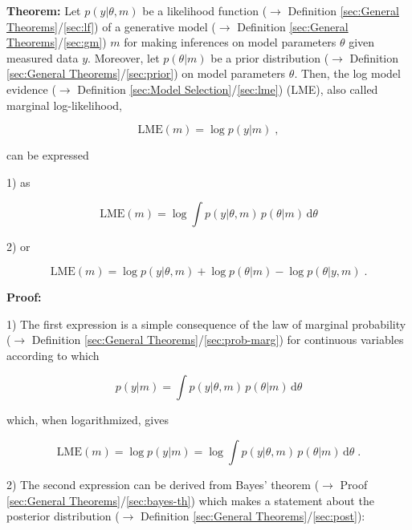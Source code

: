 \documentclass[a4paper,12pt,twoside]{book}
\begin{document}
\textbf{Theorem:} Let $p(y \vert \theta,m)$ be a likelihood function ($\rightarrow$ Definition \ref{sec:General Theorems}/\ref{sec:lf}) of a generative model ($\rightarrow$ Definition \ref{sec:General Theorems}/\ref{sec:gm}) $m$ for making inferences on model parameters $\theta$ given measured data $y$. Moreover, let $p(\theta \vert m)$ be a prior distribution ($\rightarrow$ Definition \ref{sec:General Theorems}/\ref{sec:prior}) on model parameters $\theta$. Then, the log model evidence ($\rightarrow$ Definition \ref{sec:Model Selection}/\ref{sec:lme}) (LME), also called marginal log-likelihood,

\begin{equation} \label{eq:lme-der-LME-term}
\mathrm{LME}(m) = \log p(y|m) \; ,
\end{equation}

can be expressed

1) as

\begin{equation} \label{eq:lme-der-LME-marg}
\mathrm{LME}(m) = \log \int p(y|\theta,m) \, p(\theta|m) \, \mathrm{d}\theta
\end{equation}

2) or

\begin{equation} \label{eq:lme-der-LME-bayes}
\mathrm{LME}(m) = \log p(y|\theta,m) + \log p(\theta|m) - \log p(\theta|y,m) \; .
\end{equation}


\vspace{1em}
\textbf{Proof:}

1) The first expression is a simple consequence of the law of marginal probability ($\rightarrow$ Definition \ref{sec:General Theorems}/\ref{sec:prob-marg}) for continuous variables according to which

\begin{equation} \label{eq:lme-der-ME}
p(y|m) = \int p(y|\theta,m) \, p(\theta|m) \, \mathrm{d}\theta
\end{equation}

which, when logarithmized, gives

\begin{equation} \label{eq:lme-der-LME-marg-qed}
\mathrm{LME}(m) = \log p(y|m) = \log \int p(y|\theta,m) \, p(\theta|m) \, \mathrm{d}\theta \; .
\end{equation}

2) The second expression can be derived from Bayes' theorem ($\rightarrow$ Proof \ref{sec:General Theorems}/\ref{sec:bayes-th}) which makes a statement about the posterior distribution ($\rightarrow$ Definition \ref{sec:General Theorems}/\ref{sec:post}):
\end{document}
